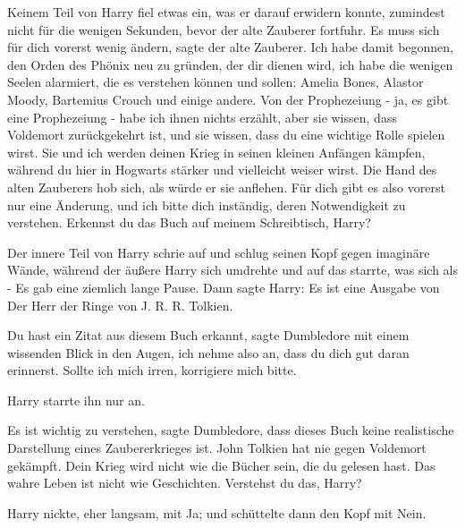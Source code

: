 Keinem Teil von Harry fiel etwas ein, was er darauf erwidern konnte, zumindest
nicht für die wenigen Sekunden, bevor der alte Zauberer fortfuhr. \glqq{}Es muss
sich für dich vorerst wenig ändern\grqq{}, sagte der alte Zauberer. \glqq{}Ich
habe damit begonnen, den Orden des Phönix neu zu gründen, der dir dienen wird,
ich habe die wenigen Seelen alarmiert, die es verstehen können und sollen:
Amelia Bones, Alastor Moody, Bartemius Crouch und einige andere. Von der
Prophezeiung - ja, es gibt eine Prophezeiung - habe ich ihnen nichts erzählt,
aber sie wissen, dass Voldemort zurückgekehrt ist, und sie wissen, dass du eine
wichtige Rolle spielen wirst. Sie und ich werden deinen Krieg in seinen kleinen
Anfängen kämpfen, während du hier in Hogwarts stärker und vielleicht weiser
wirst.\grqq{} Die Hand des alten Zauberers hob sich, als würde er sie anflehen.
\glqq{}Für dich gibt es also vorerst nur eine Änderung, und ich bitte dich
inständig, deren Notwendigkeit zu verstehen. Erkennst du das Buch auf meinem
Schreibtisch, Harry?\grqq{}

Der innere Teil von Harry schrie auf und schlug seinen Kopf gegen imaginäre
Wände, während der äußere Harry sich umdrehte und auf das starrte, was sich als
- Es gab eine ziemlich lange Pause. Dann sagte Harry: \glqq{}Es ist eine Ausgabe
von Der Herr der Ringe von J. R. R. Tolkien.\grqq{}

\glqq{}Du hast ein Zitat aus diesem Buch erkannt\grqq{}, sagte Dumbledore mit
einem wissenden Blick in den Augen, \glqq{}ich nehme also an, dass du dich gut
daran erinnerst. Sollte ich mich irren, korrigiere mich bitte.\grqq{}

Harry starrte ihn nur an.

\glqq{}Es ist wichtig zu verstehen\grqq{}, sagte Dumbledore, \glqq{}dass dieses
Buch keine realistische Darstellung eines Zaubererkrieges ist. John Tolkien hat
nie gegen Voldemort gekämpft. Dein Krieg wird nicht wie die Bücher sein, die du
gelesen hast. Das wahre Leben ist nicht wie Geschichten. Verstehst du das,
Harry?\grqq{}

Harry nickte, eher langsam, mit Ja; und schüttelte dann den Kopf mit Nein.

